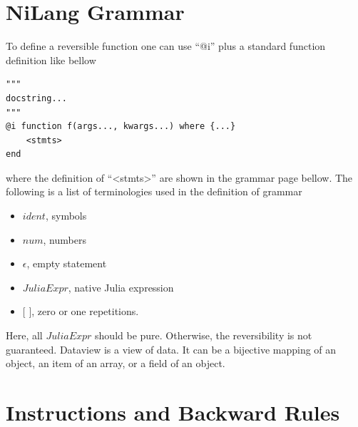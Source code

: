 \documentclass{article}
\newcommand{\<}{\langle}
\renewcommand{\>}{\rangle}
\theoremstyle{definition}\newtheorem{definition}{\textit{Definition}}
\begin{document}



\newpage
\appendix

\section{NiLang Grammar}\label{app:grammar}

To define a reversible function one can use ``@i'' plus a standard function definition like bellow

\begin{minipage}{.88\columnwidth}
\begin{lstlisting}[basicstyle=\small\ttfamily,columns=fullflexible]
"""
docstring...
"""
@i function f(args..., kwargs...) where {...}
    <stmts>
end
\end{lstlisting}
\end{minipage}
where the definition of ``<stmts>'' are shown in the grammar page bellow.
The following is a list of terminologies used in the definition of grammar
\begin{itemize}
    \item $ident$, symbols
    \item $num$, numbers
    \item $\epsilon$, empty statement
    \item $JuliaExpr$, native Julia expression
    \item $[$ $]$,  zero or one repetitions.
\end{itemize}
Here, all $JuliaExpr$ should be pure. Otherwise, the reversibility is not guaranteed.
Dataview is a view of data. It can be a bijective mapping of an object, an item of an array, or a field of an object.

\newpage

\begin{minipage}{0.6\textwidth}
    \small

\end{minipage}

\newpage
\section{Instructions and Backward Rules}\label{app:instr}
\end{document}
